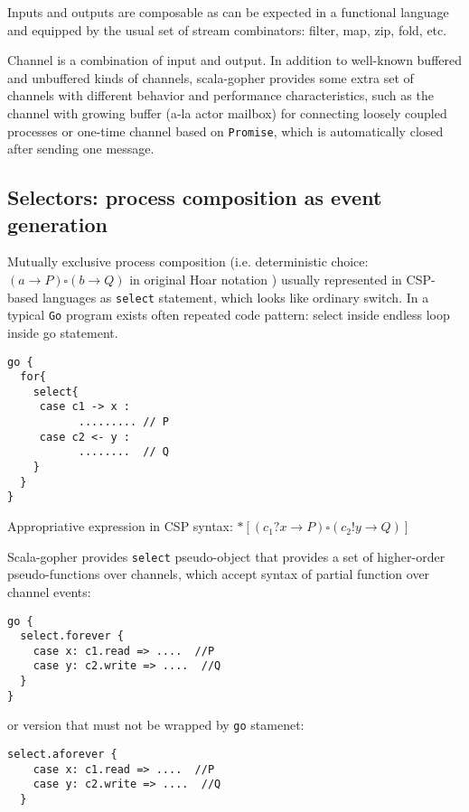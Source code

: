 \documentclass[12pt]{article}
\begin{document}
  Inputs and outputs are composable as can be expected in a functional language and equipped by 
the usual set of stream combinators: filter, map, zip, fold, etc.
 
  Channel is a combination of input and output. In addition to well-known buffered and unbuffered 
kinds of channels, scala-gopher provides some extra set of channels with different behavior and performance characteristics,
 such as the channel with growing buffer (a-la actor mailbox) for connecting loosely coupled processes or one-time channel based on \verb|Promise|, which is automatically closed after sending one message.

\subsection{Selectors: process composition as event generation}

 Mutually exclusive process composition (i.e. deterministic choice: $(a \to P)\square(b\to Q)$ in original Hoar notation )  usually represented in CSP-based languages as \verb|select| statement, which looks like ordinary switch. In a typical \verb|Go| program exists often repeated code pattern: select inside endless loop inside go statement.

\begin{Verbatim}[fontsize=\small]
go {
  for{
    select{
     case c1 -> x :
           ......... // P
     case c2 <- y :
           ........  // Q
    }
  }
}
\end{Verbatim}

  Appropriative expression in CSP syntax: $*[(c_{1} ? x \to P)\square(c_{2} ! y \to Q)]$

 Scala-gopher provides \verb|select| pseudo-object that provides a set of higher-order pseudo-functions over
channels, which accept syntax of partial function over channel events:

\begin{Verbatim}[fontsize=\small]
go {   
  select.forever {
    case x: c1.read => ....  //P
    case y: c2.write => ....  //Q
  }
}
\end{Verbatim}
   
  or version that must not be wrapped by \verb|go| stamenet:

\begin{Verbatim}[fontsize=\small]
  select.aforever {
    case x: c1.read => ....  //P
    case y: c2.write => ....  //Q
  }
\end{Verbatim}
   
\end{document}
